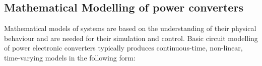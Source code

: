\documentclass[preprint,12pt]{elsarticle}
\begin{document}
\subsection{Mathematical Modelling of power converters}
%

Mathematical models of systems are based on the understanding of their physical behaviour and are needed for their simulation and control. Basic circuit modelling of power electronic converters typically produces continuous-time, non-linear, time-varying models in the following form:
\end{document}
